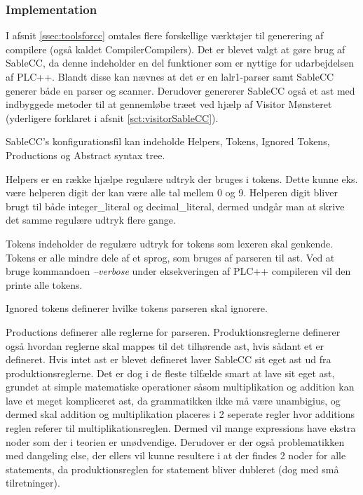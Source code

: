 \subsubsection{Implementation}

I afsnit \ref{ssec:toolsforcc} omtales flere forskellige værktøjer til generering af compilere (også kaldet CompilerCompilers). Det er blevet valgt at gøre brug af SableCC, da denne indeholder en del funktioner som er nyttige for udarbejdelsen af PLC++. Blandt disse kan nævnes at det er en \gls{lalr}1-parser samt SableCC generer både en parser og scanner. Derudover genererer SableCC også et \gls{ast} med indbyggede metoder til at gennemløbe træet ved hjælp af Visitor Mønsteret (yderligere forklaret i afsnit \ref{sct:visitorSableCC}).

SableCC's konfigurationsfil kan indeholde Helpers, Tokens, Ignored Tokens, Productions og Abstract syntax tree.

Helpers er en række hjælpe regulære udtryk der bruges i tokens. Dette kunne eks. være helperen digit der kan være alle tal mellem 0 og 9. Helperen digit bliver brugt til både integer\_literal og decimal\_literal, dermed undgår man at skrive det samme regulære udtryk flere gange.

Tokens indeholder de regulære udtryk for tokens som lexeren skal genkende. Tokens er alle mindre dele af et sprog, som bruges af parseren til \gls{ast}. Ved at bruge kommandoen \textit{--verbose} under eksekveringen af PLC++ compileren vil den printe alle tokens.

Ignored tokens definerer hvilke tokens parseren skal ignorere.

Productions definerer alle reglerne for parseren. Produktionsreglerne definerer også hvordan reglerne skal mappes til det tilhørende \gls{ast}, hvis sådant et er defineret. Hvis intet \gls{ast} er blevet defineret laver SableCC sit eget \gls{ast} ud fra produktionsreglerne. Det er dog i de fleste tilfælde smart at lave sit eget \gls{ast}, grundet at simple matematiske operationer såsom multiplikation og addition kan lave et meget kompliceret \gls{ast}, da grammatikken ikke må være unambigius, og dermed skal addition og multiplikation placeres i 2 seperate regler hvor additions reglen referer til multiplikationsreglen. Dermed vil mange expressions have ekstra noder som der i teorien er unødvendige. Derudover er der også problematikken med dangeling else, der ellers vil kunne resultere i at der findes 2 noder for alle statements, da produktionsreglen for statement bliver dubleret (dog med små tilretninger). 

